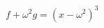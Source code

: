 \documentclass[preview]{standalone}
\begin{document}
\begin{center}
$f+\omega^2 g=(x-\omega^2)^3$
\end{center}
\end{document}
